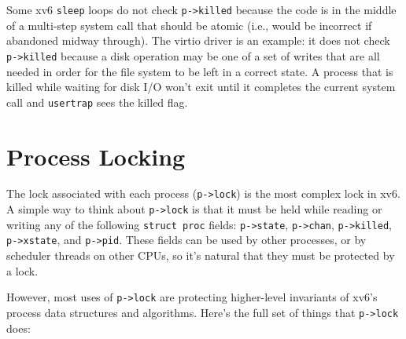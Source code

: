 Some xv6 
\lstinline{sleep}
loops do not check
\lstinline{p->killed} 
because the code is in the middle of a multi-step
system call that should be atomic (i.e., would be
incorrect if abandoned midway through).
The virtio driver
is an example: it does not check
\lstinline{p->killed}
because a disk operation may be one of a set of
writes that are all needed in order for the file system to
be left in a correct state.
A process that is killed while waiting for disk I/O won't
exit until it completes the current system call and
\lstinline{usertrap} sees the killed flag.

\section{Process Locking}

The lock associated with each process (\lstinline{p->lock}) is the
most complex lock in xv6.
A simple way to think about \lstinline{p->lock} is
that it must be held while reading or writing any of the following
\lstinline{struct proc} fields:
\lstinline{p->state},
\lstinline{p->chan},
\lstinline{p->killed},
\lstinline{p->xstate},
and
\lstinline{p->pid}.
These fields can be used by other processes, or by scheduler
threads on other CPUs, so it's natural that they
must be protected by a lock.

However, most uses of \lstinline{p->lock} are protecting higher-level
invariants of xv6's process data structures and algorithms. Here's
the full set of things that \lstinline{p->lock} does:



